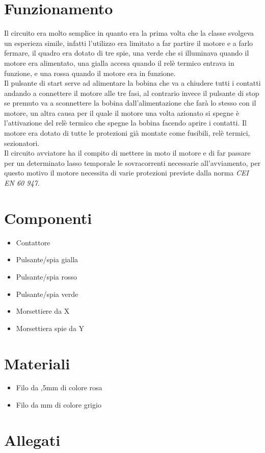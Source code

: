 \documentclass[12pt]{article}
\begin{document}
\section{Funzionamento}
Il circuito era molto semplice in quanto era la prima volta che la classe svolgeva un esperieza simile, infatti l'utilizzo era limitato a far partire il motore e a farlo fermare, il quadro era dotato di tre spie, una verde che si illuminava quando il motore era alimentato, una gialla accesa quando il relè termico entrava in funzione, e una rossa quando il motore era in funzione.\\
Il pulsante di start serve ad alimentare la bobina che va a chiudere tutti i contatti andando a connettere il motore alle tre fasi, al contrario invece il pulsante di stop se premuto va a sconnettere la bobina dall'alimentazione che farà lo stesso con il motore, un altra causa per il quale il motore una volta azionato si spegne è l'attivazione del relè termico che spegne la bobina facendo aprire i contatti.
Il motore era dotato di tutte le protezioni già montate come fusibili, relè termici, sezionatori.\\
Il circuito avviatore ha il compito di mettere in moto il motore e di far passare per un determinato lasso temporale le sovracorrenti necessarie all'avviamento, per questo motivo il motore necessita di varie protezioni previste dalla norma \textit{CEI EN 60 947}.\\


\section{Componenti}
\label{Componenti}
\begin{itemize}
    \item Contattore %
    \item Pulsante/spia gialla 
    \item Pulsante/spia rosso
    \item Pulsante/spia verde 
    \item Morsettiere da X
    \item Morsettiera spie da Y
\end{itemize}
\section{Materiali}
\begin{itemize}
    \item Filo da ,5mm  di colore rosa
    \item Filo da  mm  di colore grigio
\end{itemize}
\section{Allegati}
\newpage
\end{document}
